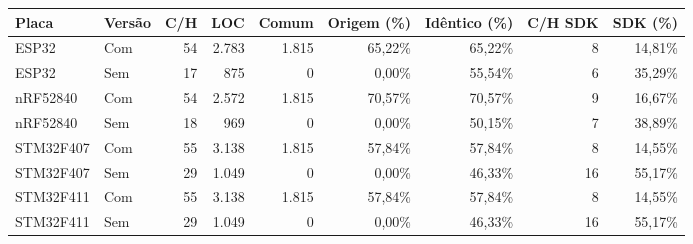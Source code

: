 \begin{tabular}{llrrrrrrr}
\hline
Placa & Versão & C/H & LOC & Comum & Origem (\%) & Idêntico (\%) & C/H SDK & SDK (\%) \\
\hline
ESP32 & Com & 54 & 2.783 & 1.815 & 65,22\% & 65,22\% & 8 & 14,81\% \\
ESP32 & Sem & 17 & 875 & 0 & 0,00\% & 55,54\% & 6 & 35,29\% \\
nRF52840 & Com & 54 & 2.572 & 1.815 & 70,57\% & 70,57\% & 9 & 16,67\% \\
nRF52840 & Sem & 18 & 969 & 0 & 0,00\% & 50,15\% & 7 & 38,89\% \\
STM32F407 & Com & 55 & 3.138 & 1.815 & 57,84\% & 57,84\% & 8 & 14,55\% \\
STM32F407 & Sem & 29 & 1.049 & 0 & 0,00\% & 46,33\% & 16 & 55,17\% \\
STM32F411 & Com & 55 & 3.138 & 1.815 & 57,84\% & 57,84\% & 8 & 14,55\% \\
STM32F411 & Sem & 29 & 1.049 & 0 & 0,00\% & 46,33\% & 16 & 55,17\% \\
\hline
\end{tabular}
